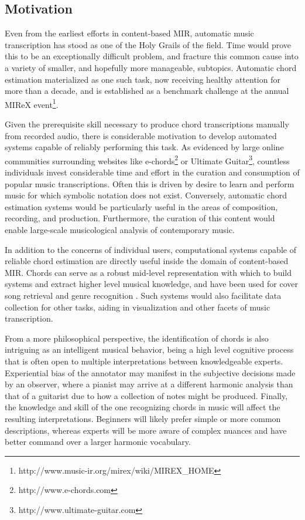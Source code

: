 \subsection{Motivation}
\label{subsec:motivation}

Even from the earliest efforts in content-based MIR, automatic music transcription has stood as one of the Holy Grails of the field.
Time would prove this to be an exceptionally difficult problem, and fracture this common cause into a variety of smaller, and hopefully more manageable, subtopics.
Automatic chord estimation materialized as one such task, now receiving healthy attention for more than a decade, and is established as a benchmark challenge at the annual MIReX event\footnote{{http://www.music-ir.org/mirex/wiki/MIREX\_HOME}}.

Given the prerequisite skill necessary to produce chord transcriptions manually from recorded audio, there is considerable motivation to develop automated systems capable of reliably performing this task.
As evidenced by large online communities surrounding websites like e-chords\footnote{http://www.e-chords.com} or Ultimate Guitar\footnote{http://www.ultimate-guitar.com}, countless individuals invest considerable time and effort in the curation and consumption of popular music transcriptions.
Often this is driven by desire to learn and perform music for which symbolic notation does not exist.
Conversely, automatic chord estimation systems would be particularly useful in the areas of composition, recording, and production.
Furthermore, the curation of this content would enable large-scale musicological analysis of contemporary music.

In addition to the concerns of individual users, computational systems capable of reliable chord estimation are directly useful inside the domain of content-based MIR.
Chords can serve as a robust mid-level representation with which to build systems and extract higher level musical knowledge, and have been used for cover song retrieval \cite{Bello2007Audio} and genre recognition \cite{Anglade2009Genre}.
Such systems would also facilitate data collection for other tasks, aiding in visualization and other facets of music transcription.

From a more philosophical perspective, the identification of chords is also intriguing as an intelligent musical behavior, being a high level cognitive process that is often open to multiple interpretations between knowledgeable experts.
Experiential bias of the annotator may manifest in the subjective decisions made by an observer, where a pianist may arrive at a different harmonic analysis than that of a guitarist due to how a collection of notes might be produced.
Finally, the knowledge and skill of the one recognizing chords in music will affect the resulting interpretations.
Beginners will likely prefer simple or more common descriptions, whereas experts will be more aware of complex nuances and have better command over a larger harmonic vocabulary.


